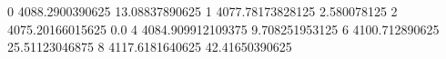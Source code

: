 0 4088.2900390625 13.08837890625
1 4077.78173828125 2.580078125
2 4075.20166015625 0.0
4 4084.909912109375 9.708251953125
6 4100.712890625 25.51123046875
8 4117.6181640625 42.41650390625
